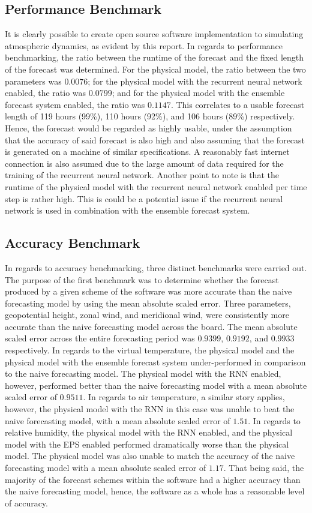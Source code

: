 \subsection{Performance Benchmark}\label{results_performance}
It is clearly possible to create open source software implementation to simulating atmospheric dynamics, as evident by this report. In regards to performance benchmarking, the ratio between the runtime of the forecast and the fixed length of the forecast was determined. For the physical model, the ratio between the two parameters was $0.0076$; for the physical model with the recurrent neural network enabled, the ratio was $0.0799$; and for the physical model with the ensemble forecast system enabled, the ratio was $0.1147$. This correlates to a usable forecast length of 119 hours (99\%), 110 hours (92\%), and 106 hours (89\%) respectively. Hence, the forecast would be regarded as highly usable, under the assumption that the accuracy of said forecast is also high and also assuming that the forecast is generated on a machine of similar specifications. A reasonably fast internet connection is also assumed due to the large amount of data required for the training of the recurrent neural network. Another point to note is that the runtime of the physical model with the recurrent neural network enabled per time step is rather high. This is could be a potential issue if the recurrent neural network is used in combination with the ensemble forecast system. 

\subsection{Accuracy Benchmark}

In regards to accuracy benchmarking, three distinct benchmarks were carried out. The purpose of the first benchmark was to determine whether the forecast produced by a given scheme of the software was more accurate than the naive forecasting model by using the mean absolute scaled error. Three parameters, geopotential height, zonal wind, and meridional wind, were consistently more accurate than the naive forecasting model across the board. The mean absolute scaled error across the entire forecasting period was $0.9399$, $0.9192$, and $0.9933$ respectively. In regards to the virtual temperature, the physical model and the physical model with the ensemble forecast system under-performed in comparison to the naive forecasting model. The physical model with the RNN enabled, however, performed better than the naive forecasting model with a mean absolute scaled error of $0.9511$. In regards to air temperature, a similar story applies, however, the physical model with the RNN in this case was unable to beat the naive forecasting model, with a mean absolute scaled error of $1.51$. In regards to relative humidity, the physical model with the RNN enabled, and the physical model with the EPS enabled performed dramatically worse than the physical model. The physical model was also unable to match the accuracy of the naive forecasting model with a mean absolute scaled error of $1.17$. That being said, the majority of the forecast schemes within the software had a higher accuracy than the naive forecasting model, hence, the software as a whole has a reasonable level of accuracy.

